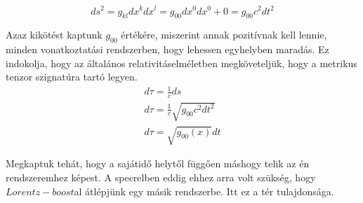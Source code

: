 \documentclass[a4paper,12pt]{article}
\begin{document}
\begin{equation*}
    ds^{2} = g_{kl}dx^{k}dx^{l} = g_{00}dx^{0}dx^{0} + 0 = g_{00}c^{2}dt^{2}
\end{equation*}
\par Azaz kikötést kaptunk $g_{00}$ értékére, miszerint annak pozitívnak kell lennie, minden vonatkoztatási rendszerben, hogy lehessen egyhelyben maradás. Ez indokolja, hogy az általános relativitáselméletben megköveteljük, hogy a metrikus tenzor szignatúra tartó legyen.
\begin{gather*}
    d\tau = \frac{1}{c}ds \\
    d\tau = \frac{1}{c}\sqrt{g_{00}c^{2}dt^{2}} \\
    d\tau = \sqrt{g_{00}(x)}dt
\end{gather*}
\par Megkaptuk tehát, hogy a sajátidő helytől függően máshogy telik az én rendszeremhez képest. A specrelben eddig ehhez arra volt szükség, hogy $Lorentz-boost$al átlépjünk egy másik rendszerbe. Itt ez a tér tulajdonsága.
\end{document}
